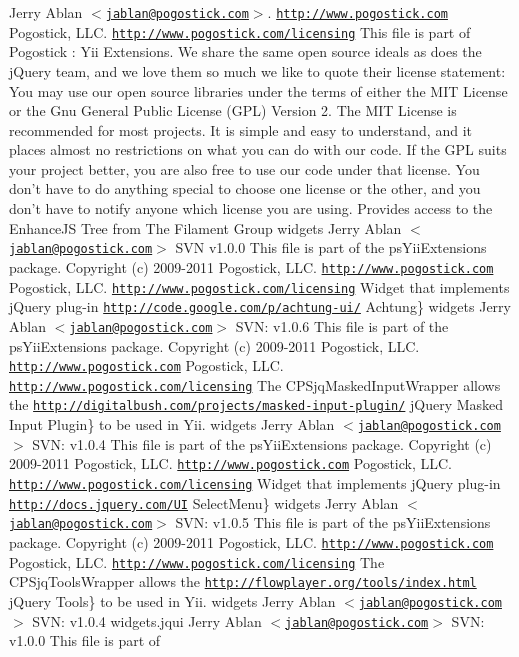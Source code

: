 Jerry Ablan $<$\href{mailto:jablan@pogostick.com}{\tt jablan@pogostick.com}$>$.  \href{http://www.pogostick.com}{\tt http://www.pogostick.com} Pogostick, LLC.  \href{http://www.pogostick.com/licensing}{\tt http://www.pogostick.com/licensing}  This file is part of Pogostick : Yii Extensions.  We share the same open source ideals as does the jQuery team, and we love them so much we like to quote their license statement:  You may use our open source libraries under the terms of either the MIT License or the Gnu General Public License (GPL) Version 2.  The MIT License is recommended for most projects. It is simple and easy to understand, and it places almost no restrictions on what you can do with our code.  If the GPL suits your project better, you are also free to use our code under that license.  You don’t have to do anything special to choose one license or the other, and you don’t have to notify anyone which license you are using. Provides access to the EnhanceJS Tree from The Filament Group   widgets   Jerry Ablan $<$\href{mailto:jablan@pogostick.com}{\tt jablan@pogostick.com}$>$  SVN   v1.0.0    This file is part of the psYiiExtensions package.   Copyright (c) 2009-\/2011 Pogostick, LLC.  \href{http://www.pogostick.com}{\tt http://www.pogostick.com} Pogostick, LLC.  \href{http://www.pogostick.com/licensing}{\tt http://www.pogostick.com/licensing} Widget that implements jQuery plug-\/in  \href{http://code.google.com/p/achtung-ui/}{\tt http://code.google.com/p/achtung-\/ui/} Achtung\}   widgets   Jerry Ablan $<$\href{mailto:jablan@pogostick.com}{\tt jablan@pogostick.com}$>$  SVN:   v1.0.6    This file is part of the psYiiExtensions package.   Copyright (c) 2009-\/2011 Pogostick, LLC.  \href{http://www.pogostick.com}{\tt http://www.pogostick.com} Pogostick, LLC.  \href{http://www.pogostick.com/licensing}{\tt http://www.pogostick.com/licensing} The CPSjqMaskedInputWrapper allows the  \href{http://digitalbush.com/projects/masked-input-plugin/}{\tt http://digitalbush.com/projects/masked-\/input-\/plugin/} jQuery Masked Input Plugin\} to be used in Yii.   widgets   Jerry Ablan $<$\href{mailto:jablan@pogostick.com}{\tt jablan@pogostick.com}$>$  SVN:   v1.0.4    This file is part of the psYiiExtensions package.   Copyright (c) 2009-\/2011 Pogostick, LLC.  \href{http://www.pogostick.com}{\tt http://www.pogostick.com} Pogostick, LLC.  \href{http://www.pogostick.com/licensing}{\tt http://www.pogostick.com/licensing} Widget that implements jQuery plug-\/in  \href{http://docs.jquery.com/UI}{\tt http://docs.jquery.com/UI} SelectMenu\}   widgets   Jerry Ablan $<$\href{mailto:jablan@pogostick.com}{\tt jablan@pogostick.com}$>$  SVN:   v1.0.5    This file is part of the psYiiExtensions package.   Copyright (c) 2009-\/2011 Pogostick, LLC.  \href{http://www.pogostick.com}{\tt http://www.pogostick.com} Pogostick, LLC.  \href{http://www.pogostick.com/licensing}{\tt http://www.pogostick.com/licensing} The CPSjqToolsWrapper allows the  \href{http://flowplayer.org/tools/index.html}{\tt http://flowplayer.org/tools/index.html} jQuery Tools\} to be used in Yii.   widgets   Jerry Ablan $<$\href{mailto:jablan@pogostick.com}{\tt jablan@pogostick.com}$>$  SVN:   v1.0.4     widgets.jqui   Jerry Ablan $<$\href{mailto:jablan@pogostick.com}{\tt jablan@pogostick.com}$>$  SVN:   v1.0.0    This file is part of 